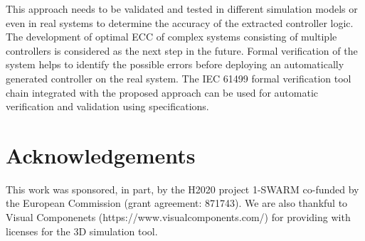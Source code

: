 \documentclass[conference]{IEEEtran}
\begin{document}
This approach needs to  be validated and tested in different simulation models or even in real systems to determine the accuracy of the extracted controller logic. The development of optimal ECC of complex systems consisting of multiple controllers is considered as the next step in the future. Formal verification of the system helps to identify the possible errors before deploying an automatically generated controller on the real system. The IEC 61499 formal verification tool chain \cite{xavier2021cyber} integrated with the proposed approach can be used for automatic verification and validation using specifications.


\section{Acknowledgements}
This work was sponsored, in part, by the H2020 project 1-SWARM co-funded by the European Commission (grant agreement: 871743). We are also thankful to Visual Componenets (https://www.visualcomponents.com/) for providing with licenses for the 3D simulation tool.



\end{document}
